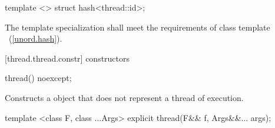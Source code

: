 \begin{itemdecl}
template <> struct hash<thread::id>;
\end{itemdecl}

\begin{itemdescr}
\pnum The template specialization shall meet the requirements of class template
~(\ref{unord.hash}).
\end{itemdescr}

[thread.thread.constr]{ constructors}

%
\begin{itemdecl}
thread() noexcept;
\end{itemdecl}

\begin{itemdescr}
\pnum\effects Constructs a  object that does not represent a thread of execution.

\pnum\postcondition {}
\end{itemdescr}

%
\begin{itemdecl}
template <class F, class ...Args> explicit thread(F&& f, Args&&... args);
\end{itemdecl}

